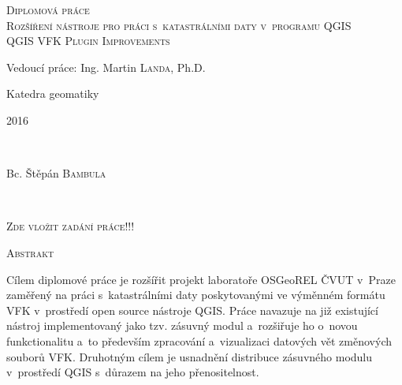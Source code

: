 \documentclass[12pt]{article}
\begin{document}
\begin{titlepage}
\textsc{\Large Diplomová práce}\\
\vfill
\textsc{\LARGE  Rozšíření nástroje pro práci s~katastrálními daty v~programu QGIS}\\[0.5cm] %

\textsc{\Large QGIS VFK Plugin Improvements}
 
 
 \vfill
\large Vedoucí práce: Ing. Martin \textsc{Landa}, Ph.D.

Katedra geomatiky
 
\vfill
\begin{minipage}{0.4\textwidth}
\begin{flushleft} 
\large 2016	%
\end{flushleft}
\end{minipage}
~
\begin{minipage}{0.4\textwidth}
\begin{flushright} 
\large Bc. Štěpán \textsc{Bambula} \\ %
\end{flushright}
\end{minipage}\\[1cm]
 
\end{titlepage}

\clearpage
\pagestyle{empty}

\vspace*{\fill}
\begin{center}
\textsc{\Large Zde vložit zadání práce!!!}
\end{center}

\vspace*{\fill}

\clearpage

\hfill

\noindent
\textsc{\Large Abstrakt}

\vspace{12pt}

Cílem diplomové práce je rozšířit projekt laboratoře OSGeoREL ČVUT v~Praze zaměřený na práci s~katastrálními daty poskytovanými ve výměnném formátu VFK v~prostředí open source nástroje QGIS. Práce navazuje na již existující nástroj implementovaný jako tzv. zásuvný modul a~rozšiřuje ho o~novou funkctionalitu a~to především zpracování a~vizualizaci datových vět změnových souborů VFK. Druhotným cílem je usnadnění distribuce zásuvného modulu v~prostředí QGIS s~důrazem na jeho přenositelnost.
\end{document}
